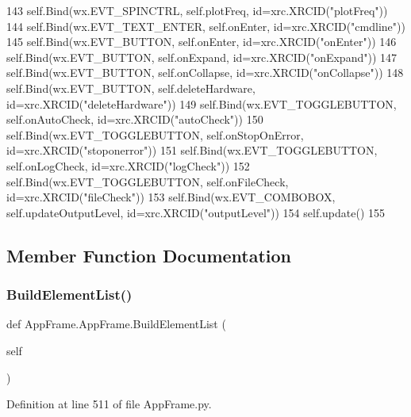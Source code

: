 \begin{DoxyCode}
143         self.Bind(wx.EVT\_SPINCTRL, self.plotFreq, id=xrc.XRCID(\textcolor{stringliteral}{"plotFreq"}))
144         self.Bind(wx.EVT\_TEXT\_ENTER, self.onEnter, id=xrc.XRCID(\textcolor{stringliteral}{"cmdline"}))
145         self.Bind(wx.EVT\_BUTTON, self.onEnter, id=xrc.XRCID(\textcolor{stringliteral}{"onEnter"}))
146         self.Bind(wx.EVT\_BUTTON, self.onExpand, id=xrc.XRCID(\textcolor{stringliteral}{"onExpand"}))
147         self.Bind(wx.EVT\_BUTTON, self.onCollapse, id=xrc.XRCID(\textcolor{stringliteral}{"onCollapse"}))
148         self.Bind(wx.EVT\_BUTTON, self.deleteHardware, id=xrc.XRCID(\textcolor{stringliteral}{"deleteHardware"}))
149         self.Bind(wx.EVT\_TOGGLEBUTTON, self.onAutoCheck, id=xrc.XRCID(\textcolor{stringliteral}{"autoCheck"}))
150         self.Bind(wx.EVT\_TOGGLEBUTTON, self.onStopOnError, id=xrc.XRCID(\textcolor{stringliteral}{"stoponerror"}))
151         self.Bind(wx.EVT\_TOGGLEBUTTON, self.onLogCheck, id=xrc.XRCID(\textcolor{stringliteral}{"logCheck"}))
152         self.Bind(wx.EVT\_TOGGLEBUTTON, self.onFileCheck, id=xrc.XRCID(\textcolor{stringliteral}{"fileCheck"}))
153         self.Bind(wx.EVT\_COMBOBOX, self.updateOutputLevel, id=xrc.XRCID(\textcolor{stringliteral}{"outputLevel"}))        
154         self.update()
155                 
\end{DoxyCode}


\subsection{Member Function Documentation}
\mbox{\label{classAppFrame_1_1AppFrame_a90f00924adb754f9e2cee4a658e3e5e9}} 
\subsubsection{\texorpdfstring{Build\+Element\+List()}{BuildElementList()}}
{\footnotesize\ttfamily def App\+Frame.\+App\+Frame.\+Build\+Element\+List (\begin{DoxyParamCaption}\item[{}]{self }\end{DoxyParamCaption})}



Definition at line 511 of file App\+Frame.\+py.


